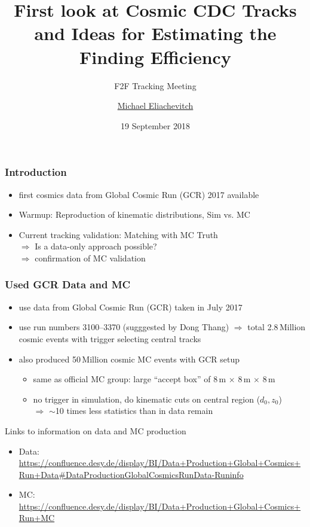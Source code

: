 \documentclass[18pt]{beamer}
\title{First look at Cosmic CDC Tracks and Ideas for Estimating the Finding Efficiency}
\subtitle{F2F Tracking Meeting}
\author{\underline{Michael Eliachevitch}}
\date{19 September 2018}
\institute{ETP - KIT}
\begin{document}

  \begin{frame}
  \titlepage
  \end{frame}

  \begin{frame}
    \frametitle{Introduction}
    \begin{itemize}
    \item first cosmics data from Global Cosmic Run (GCR) 2017 available
    \item Warmup: Reproduction of kinematic distributions, Sim vs. MC
    \item Current tracking validation: Matching with MC Truth\\
      $\Rightarrow$ Is a data-only approach possible?\\
      $\Rightarrow$ confirmation of MC validation
    \end{itemize}
  \end{frame}

  \begin{frame}
    \frametitle{Used GCR Data and MC}
    \begin{itemize}
    \item use data from Global Cosmic Run (GCR) taken in July 2017
    \item use run numbers 3100--3370 (sugggested by Dong Thang)
      $\Rightarrow$ total 2.8\,Million cosmic events with trigger selecting central tracks\\
    \item also produced 50\,Million cosmic MC events with GCR setup
      \begin{itemize}
      \item same as official MC group: large ``accept box'' of 8\,m $\times$ 8\,m $\times$ 8\,m 
      \item no trigger in simulation, do kinematic cuts on central region ($d_0, z_0$)\\
        $\Rightarrow$  $\sim$10 times less statistics than in data remain
      \end{itemize}
    \end{itemize}

    \begin{block}{Links to information on data and MC production}
      \begin{itemize}
      \item Data: \footnotesize{\url{https://confluence.desy.de/display/BI/Data+Production+Global+Cosmics+Run+Data\#DataProductionGlobalCosmicsRunData-Runinfo}}
      \item MC: \footnotesize{\url{https://confluence.desy.de/display/BI/Data+Production+Global+Cosmics+Run+MC}}
      \end{itemize}
    \end{block}
  \end{frame}
\end{document}
